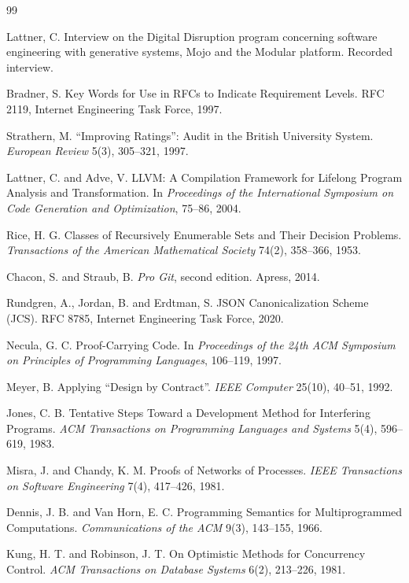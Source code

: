 \documentclass[11pt]{article}
\theoremstyle{remark}
\begin{document}
\begin{thebibliography}{99}

Lattner, C. Interview on the Digital Disruption program concerning software engineering with generative systems, Mojo and the Modular platform. Recorded interview.

Bradner, S. Key Words for Use in RFCs to Indicate Requirement Levels. RFC 2119, Internet Engineering Task Force, 1997.

Strathern, M. ``Improving Ratings'': Audit in the British University System. \emph{European Review} 5(3), 305--321, 1997.

Lattner, C. and Adve, V. LLVM: A Compilation Framework for Lifelong Program Analysis and Transformation. In \emph{Proceedings of the International Symposium on Code Generation and Optimization}, 75--86, 2004.

Rice, H. G. Classes of Recursively Enumerable Sets and Their Decision Problems. \emph{Transactions of the American Mathematical Society} 74(2), 358--366, 1953.

Chacon, S. and Straub, B. \emph{Pro Git}, second edition. Apress, 2014.

Rundgren, A., Jordan, B. and Erdtman, S. JSON Canonicalization Scheme (JCS). RFC 8785, Internet Engineering Task Force, 2020.

Necula, G. C. Proof-Carrying Code. In \emph{Proceedings of the 24th ACM Symposium on Principles of Programming Languages}, 106--119, 1997.

Meyer, B. Applying ``Design by Contract''. \emph{IEEE Computer} 25(10), 40--51, 1992.

Jones, C. B. Tentative Steps Toward a Development Method for Interfering Programs. \emph{ACM Transactions on Programming Languages and Systems} 5(4), 596--619, 1983.

Misra, J. and Chandy, K. M. Proofs of Networks of Processes. \emph{IEEE Transactions on Software Engineering} 7(4), 417--426, 1981.

Dennis, J. B. and Van Horn, E. C. Programming Semantics for Multiprogrammed Computations. \emph{Communications of the ACM} 9(3), 143--155, 1966.

Kung, H. T. and Robinson, J. T. On Optimistic Methods for Concurrency Control. \emph{ACM Transactions on Database Systems} 6(2), 213--226, 1981.


\end{thebibliography}
\end{document}

